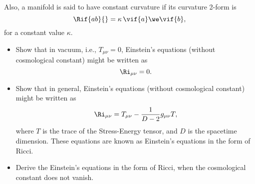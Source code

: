 Also, a manifold is said to have constant curvature if its curvature 2-form is
\begin{equation}
  \Rif{ab}{} = \kappa \, \vif{a} \we \vif{b},
\end{equation}
for a constant value $\kappa$.

\begin{Ebox}
  \begin{itemize}
  \item Show that in vacuum, i.e., $T_{\mu \nu} = 0$, Einstein's equations (without cosmological constant) might be written as
    \begin{equation}
      \Ri_{\mu \nu} = 0.
    \end{equation}
  \item Show that in general, Einstein's equations  (without cosmological constant) might be written as
    \begin{equation}
      \Ri_{\mu \nu} = T_{\mu \nu} - \frac{1}{D-2} g_{\mu \nu} T,
    \end{equation}
    where $T$ is the trace of the Stress-Energy tensor,  and  $D$ is the spacetime dimension. These equations are known as Einstein's equations in the form of Ricci.
  \item Derive the Einstein's equations in the form of Ricci, when the cosmological constant does not vanish.
  \end{itemize}
\end{Ebox}



